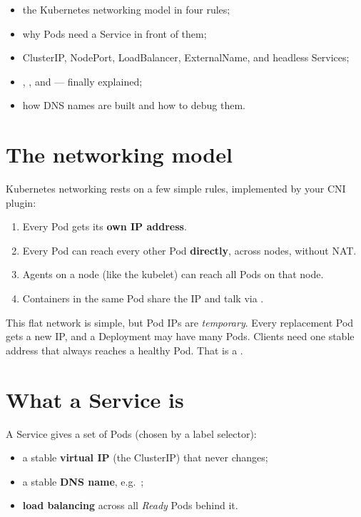 
\begin{objectives}
\begin{itemize}
  \item the Kubernetes networking model in four rules;
  \item why Pods need a Service in front of them;
  \item ClusterIP, NodePort, LoadBalancer, ExternalName, and headless Services;
  \item {}, , and  --- finally explained;
  \item how DNS names are built and how to debug them.
\end{itemize}
\end{objectives}

\section{The networking model}

Kubernetes networking rests on a few simple rules, implemented by your CNI plugin:

\begin{enumerate}
  \item Every Pod gets its \textbf{own IP address}.
  \item Every Pod can reach every other Pod \textbf{directly}, across nodes, without NAT.
  \item Agents on a node (like the kubelet) can reach all Pods on that node.
  \item Containers in the same Pod share the IP and talk via .
\end{enumerate}

This flat network is simple, but Pod IPs are \emph{temporary}. Every
replacement Pod gets a new IP, and a Deployment may have many Pods. Clients need
one stable address that always reaches a healthy Pod. That is a .

\section{What a Service is}

A Service gives a set of Pods (chosen by a label selector):

\begin{itemize}
  \item a stable \textbf{virtual IP} (the ClusterIP) that never changes;
  \item a stable \textbf{DNS name}, e.g.\ ;
  \item \textbf{load balancing} across all \emph{Ready} Pods behind it.
\end{itemize}


